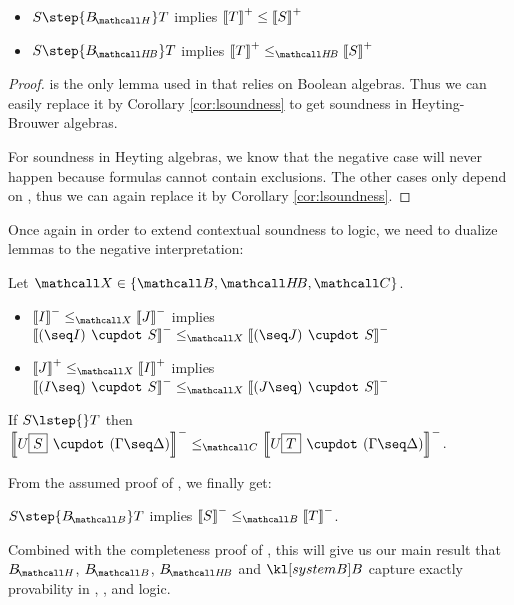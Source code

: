 \begin{corollary}\label{cor:soundness}
  \sbr
  \begin{itemize}
    \item $S \step{\sysBH} T$ implies $\left\llbracket T \right\rrbracket^+ \leq \left\llbracket S \right\rrbracket^+$
    \item $S \step{\sysBHB} T$ implies $\psint{T} \sementHB \psint{S}$
  \end{itemize}
\end{corollary}
\begin{proof}
   is the only lemma used in
   that relies on Boolean algebras. Thus we can
  easily replace it by Corollary \ref{cor:lsoundness} to get soundness in Heyting-Brouwer
  algebras.

  For soundness in Heyting algebras, we know that the negative case will never
  happen because formulas cannot contain exclusions. The other cases only depend
  on , thus we can again replace it by
  Corollary \ref{cor:lsoundness}.
\end{proof}

Once again in order to extend contextual soundness to  logic,
we need to dualize lemmas to the negative interpretation:

\begin{lemma}[Co-functoriality]
  Let $\ACVar \in \{\Brouwer, \HeytingBrouwer, \Boolean\}$.
  \sbr
  \begin{itemize}
    \item $\nsint{I} \sementX \nsint{J}$ implies $\nsint{(\seq I) \mix S}
    \sementX \nsint{(\seq J) \mix S}$
    \item $\psint{J} \sementX \psint{I}$ implies $\nsint{(I \seq) \mix S}
    \sementX \nsint{(J \seq) \mix S}$
  \end{itemize}
\end{lemma}

\begin{lemma}
  If $S \lstep{} T$ then $\nsint{U\select{S} \mix (\Gamma \seq \Delta)} \sementC
  \nsint{U\select{T} \mix (\Gamma \seq \Delta)}$.
\end{lemma}

From the assumed proof of , we finally get:

\begin{corollary}\label{cor:cosoundness}
  $S \step{\sysBB} T$ implies $\nsint{S} \sementB \nsint{T}$.
\end{corollary}

Combined with the completeness proof of , this will
give us our main result that $\sysBH$, $\sysBB$, $\sysBHB$ and $\sysB$ capture
exactly provability in , , 
and  logic.